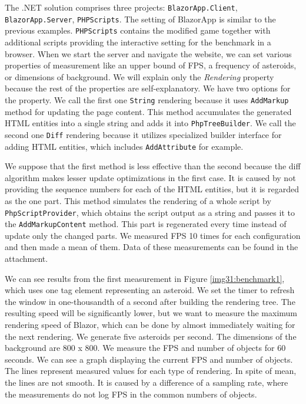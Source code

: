 The .NET solution comprises three projects: \texttt{BlazorApp.Client}, \texttt{BlazorApp.Server}, \texttt{PHPScripts}.
The setting of BlazorApp is similar to the previous examples.
\texttt{PHPScripts} contains the modified game together with additional scripts providing the interactive setting for the benchmark in a browser.
When we start the server and navigate the website, we can set various properties of measurement like an upper bound of FPS, a frequency of asteroids, or dimensions of background.
We will explain only the \textit{Rendering} property because the rest of the properties are self-explanatory.
We have two options for the property.
We call the first one \texttt{String} rendering because it uses \texttt{AddMarkup} method for updating the page content.
This method accumulates the generated HTML entities into a single string and adds it into \texttt{PhpTreeBuilder}.
We call the second one \texttt{Diff} rendering because it utilizes specialized builder interface for adding HTML entities, which includes \texttt{AddAttribute} for example.
\par
We suppose that the first method is less effective than the second because the diff algorithm makes lesser update optimizations in the first case.
It is caused by not providing the sequence numbers for each of the HTML entities, but it is regarded as the one part.
This method simulates the rendering of a whole script by \texttt{PhpScriptProvider}, which obtains the script output as a string and passes it to the \texttt{AddMarkupContent} method.
This part is regenerated every time instead of update only the changed parts.
We measured FPS 10 times for each configuration and then made a mean of them.
Data of these measurements can be found in the attachment.
\par
We can see results from the first measurement in Figure \ref{img31:benchmark1}, which uses one tag element representing an asteroid.
We set the timer to refresh the window in one-thousandth of a second after building the rendering tree.
The resulting speed will be significantly lower, but we want to measure the maximum rendering speed of Blazor, which can be done by almost immediately waiting for the next rendering. 
We generate five asteroids per second.
The dimensions of the background are 800 x 800.
We measure the FPS and number of objects for 60 seconds.
We can see a graph displaying the current FPS and number of objects.
The lines represent measured values for each type of rendering.
In spite of mean, the lines are not smooth.
It is caused by a difference of a sampling rate, where the measurements do not log FPS in the common numbers of objects.

